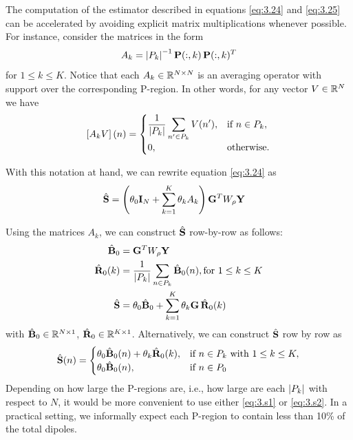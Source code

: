 The computation of the estimator described in equations \eqref{eq:3.24} and \eqref{eq:3.25} can be accelerated by avoiding explicit matrix multiplications whenever possible.
%
For instance, consider the matrices in the form 
\begin{equation}
    A_k = \left| {P_k} \right|^{-1} \mathbf{P}(:,k)\, \mathbf{P}(:,k)^T
\end{equation}
for $1\leq k \leq K$. 
%
Notice that each $A_k \in \mathbb{R}^{N\times N}$ is an averaging operator with support over the corresponding P-region.
%
In other words, for any vector $V\in \mathbb{R}^{N}$ we have
\begin{equation}
    \left[ A_k V \right](n) =
    \begin{cases}
        {\displaystyle \frac{1}{ \left| {P_k} \right| } \sum_{n'\in P_k} V(n')}, 
        &\text{if } n\in P_k, \\
        0, &\text{otherwise}.
    \end{cases}
\end{equation}

With this notation at hand, we can rewrite equation \eqref{eq:3.24} as
\begin{align}
    \hat{\mathbf{S}}
    &=
    \left( \theta_0 \mathbf{I}_N + \sum_{k=1}^K \theta_k A_k \right)\mathbf{G}^T W_\rho \mathbf{Y}
\end{align}


Using the matrices $A_k$, we can construct $\hat{\mathbf{S}}$ row-by-row as follows:
\begin{align}
    \hat{\mathbf{B}}_0
    &=
    \mathbf{G}^T W_\rho \mathbf{Y} \\
    \hat{\mathbf{R}}_0(k)
    &=
    {\displaystyle \frac{1}{\left| {P_k} \right|} \sum_{n\in P_k} \hat{\mathbf{B}}_0(n)},
    \text{for } 1\leq k \leq K
    \\
    \hat{\mathbf{S}}
    &=
    \theta_0 \hat{\mathbf{B}}_0 + 
    \sum_{k=1}^K
    \theta_k \mathbf{G}\, \hat{\mathbf{R}}_0(k)
    \label{eq:3.s1}
\end{align}
with $\hat{\mathbf{B}}_0 \in \mathbb{R}^{N\times 1}$, $\hat{\mathbf{R}}_0 \in \mathbb{R}^{K\times 1}$.
%
Alternatively, we can construct $\hat{\mathbf{S}}$ row by row as
\begin{equation}
    \hat{\mathbf{S}}(n) =
    \begin{cases}
        \theta_0 \hat{\mathbf{B}}_0(n) + \theta_k \hat{\mathbf{R}}_0(k),
        &\text{if } n\in P_k \text{ with } 1\leq k \leq K,
        \\
        \theta_0 \hat{\mathbf{B}}_0(n), &\text{if } n\in P_0
    \end{cases}
    \label{eq:3.s2}
\end{equation}
Depending on how large the P-regions are, i.e., how large are each $\left| {P_k} \right|$ with respect to $N$, it would be more convenient to use
either \eqref{eq:3.s1} or \eqref{eq:3.s2}.
%
In a practical setting, we informally expect each P-region to contain less than 10\% of the total dipoles.

